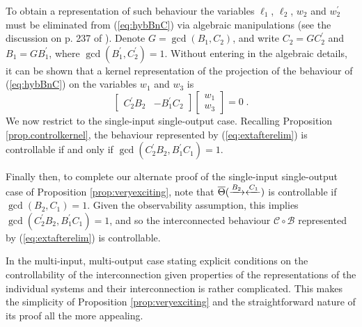 To obtain a representation of such behaviour the variables $\ell_1$, $\ell_2$,
$w_2$ and $w_2^\prime$ must be eliminated from (\ref{eq:hybBnC}) via algebraic
manipulations (see the discussion on p. 237 of \cite{Wi2}). Denote
$G=\gcd(B_1,C_2)$, and write $C_2=G C_2^\prime$ and $B_1=G B_1^\prime$, where
$\gcd(B_1^\prime, C_2^\prime)=1$.  Without entering in the algebraic details, it
can be shown that a kernel representation of the projection of the behaviour of
(\ref{eq:hybBnC}) on the variables $w_1$ and $w_3$ is
\begin{equation}\label{eq:extafterelim}
  \begin{bmatrix} C_2^\prime B_2& -B_1^\prime C_2\end{bmatrix} 
  \begin{bmatrix} w_1\\ w_3\end{bmatrix}=0\; .
\end{equation}
We now restrict to the single-input single-output case. Recalling Proposition
\ref{prop.controlkernel}, the behaviour represented by (\ref{eq:extafterelim}) is
controllable if and only if $\gcd(C_2^\prime B_2, B_1^\prime C_1)=1$. 

Finally then, to complete our alternate proof of the single-input single-output
case of Proposition \ref{prop:veryexciting}, note that
$\overline{\Theta}(\xrightarrow{B_2}\xleftarrow{C_1})$ is controllable if
$\gcd(B_2, C_1)=1$.  Given the observability assumption, this implies
$\gcd(C_2^\prime B_2, B_1^\prime C_1)=1$, and so the interconnected behaviour
$\mathscr{C} \circ \mathscr{B}$ represented by (\ref{eq:extafterelim}) is
controllable. 

In the multi-input, multi-output case stating explicit conditions on the
controllability of the interconnection given properties of the
representations of the individual systems and their interconnection is rather
complicated. This makes the simplicity of Proposition \ref{prop:veryexciting} and the
straightforward nature of its proof all the more appealing.




